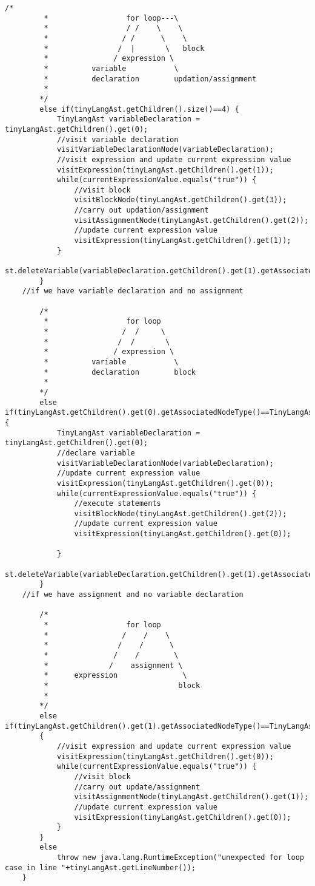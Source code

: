 \begin{lstlisting}[basicstyle=\miniscule,caption=Interpreter,label=listing:interpreter]
		/*
		 * 				    for loop---\
		 * 			   	    / /    \    \ 
		 * 		           / /      \    \
		 * 				  /  |       \   block
         * 	             / expression \
 		 *          variable           \
		 *          declaration        updation/assignment
		 *
	 	*/
		else if(tinyLangAst.getChildren().size()==4) {
			TinyLangAst variableDeclaration = tinyLangAst.getChildren().get(0);
			//visit variable declaration 
			visitVariableDeclarationNode(variableDeclaration);
			//visit expression and update current expression value
			visitExpression(tinyLangAst.getChildren().get(1));
			while(currentExpressionValue.equals("true")) {
				//visit block
				visitBlockNode(tinyLangAst.getChildren().get(3));
				//carry out updation/assignment
				visitAssignmentNode(tinyLangAst.getChildren().get(2));
				//update current expression value
				visitExpression(tinyLangAst.getChildren().get(1));
			}
			st.deleteVariable(variableDeclaration.getChildren().get(1).getAssociatedNodeValue());
		}
	//if we have variable declaration and no assignment
		
		/*
		 * 				    for loop 
		 * 		           /  /     \  
		 * 				  /  /       \  
         * 	             / expression \ 
 		 *          variable           \
		 *          declaration        block
		 *
	 	*/
		else if(tinyLangAst.getChildren().get(0).getAssociatedNodeType()==TinyLangAstNodes.AST_VARIABLE_DECLARATION_NODE) {
			TinyLangAst variableDeclaration = tinyLangAst.getChildren().get(0); 
			//declare variable
			visitVariableDeclarationNode(variableDeclaration);
			//update current expression value 
			visitExpression(tinyLangAst.getChildren().get(0));
			while(currentExpressionValue.equals("true")) {
				//execute statements
				visitBlockNode(tinyLangAst.getChildren().get(2));
				//update current expression value
				visitExpression(tinyLangAst.getChildren().get(0));

			}
			st.deleteVariable(variableDeclaration.getChildren().get(1).getAssociatedNodeValue());
		}	
	//if we have assignment and no variable declaration
		
		/*
		 * 				    for loop 
		 * 		           /    /    \  
		 * 				  /    /      \  
         * 	             /    /        \
         *              /    assignment \ 
 		 *      expression               \
		 *                              block
		 *
	 	*/
		else if(tinyLangAst.getChildren().get(1).getAssociatedNodeType()==TinyLangAstNodes.AST_ASSIGNMENT_NODE)
		{
			//visit expression and update current expression value
			visitExpression(tinyLangAst.getChildren().get(0));
			while(currentExpressionValue.equals("true")) {
				//visit block
				//carry out update/assignment
				visitAssignmentNode(tinyLangAst.getChildren().get(1));
				//update current expression value
				visitExpression(tinyLangAst.getChildren().get(0));
			}
		}
		else 
			throw new java.lang.RuntimeException("unexpected for loop case in line "+tinyLangAst.getLineNumber());
	}


\end{lstlisting}
